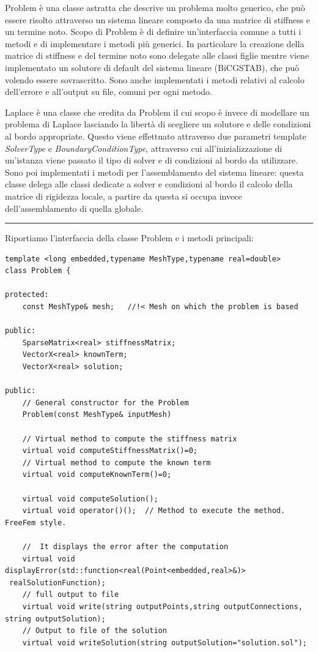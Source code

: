 \documentclass[oneside,12pt]{book}  %
\theoremstyle{plain}
\theoremstyle{definition}
\theoremstyle{remark}
\numberwithin{equation}{chapter} %
\begin{document}
Problem \`e una classe astratta che descrive un problema molto generico, che pu\`o
essere risolto attraverso un sistema lineare composto da una matrice
di stiffness e un termine noto. Scopo di Problem \`e di definire
un'interfaccia comune a tutti i metodi e di implementare i metodi
pi\`u generici. In particolare la creazione della matrice di stiffness
e del termine noto sono delegate alle classi figlie mentre viene
implementato un solutore di default del sistema lineare (BiCGSTAB),
che pu\`o volendo essere sovrascritto. Sono anche implementati i
metodi relativi al calcolo dell'errore e all'output su file, comuni per ogni metodo.

Laplace \`e una classe che eredita da Problem il cui scopo \`e invece
di modellare un problema di Laplace lasciando la libert\`a di
scegliere un solutore e delle condizioni al bordo appropriate.  
Questo viene effettuato attraverso due parametri template
\textit{SolverType} e \textit{BoundaryConditionType}, attraverso cui
all'inizializzazione di un'istanza viene passato il tipo di solver e
di condizioni al bordo da utilizzare.
Sono poi implementati i metodi per l'assemblamento del sistema
lineare: questa classe delega alle classi
dedicate a solver e condizioni al bordo il calcolo della matrice di
rigidezza locale, a partire da questa si occupa invece dell'assemblamento di quella
globale.

\noindent\rule{14cm}{1pt}

Riportiamo l'interfaccia della classe Problem e i metodi principali:

\begin{verbatim}
template <long embedded,typename MeshType,typename real=double>
class Problem {
	
protected:
    const MeshType& mesh;	//!< Mesh on which the problem is based

public:
    SparseMatrix<real> stiffnessMatrix;
    VectorX<real> knownTerm;
    VectorX<real> solution;
	
public:
    // General constructor for the Problem
    Problem(const MeshType& inputMesh)

    // Virtual method to compute the stiffness matrix
    virtual void computeStiffnessMatrix()=0;
    // Virtual method to compute the known term
    virtual void computeKnownTerm()=0;	

    virtual void computeSolution();
    virtual void operator()();  // Method to execute the method. FreeFem style.

    //  It displays the error after the computation
    virtual void displayError(std::function<real(Point<embedded,real>&)>
 realSolutionFunction);
    // full output to file 
    virtual void write(string outputPoints,string outputConnections,
string outputSolution);	
    // Output to file of the solution
    virtual void writeSolution(string outputSolution="solution.sol");


\end{verbatim}
\end{document}
